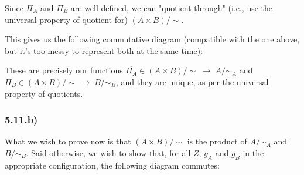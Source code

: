 \documentclass[12pt, letterpaper, twoside]{report}
\begin{document}
Since $\Pi_A$ and $\Pi_B$ are well-defined, we can "quotient through" (i.e., use the universal property of quotient for) $(A \times B)/\sim$.

This gives us the following commutative diagram (compatible with the one above, but it's too messy to represent both at the same time):


These are precisely our functions $\overline{\Pi_A} \in (A \times B)/\sim \; \to \; A/\sim_A$ and $\overline{\Pi_B} \in (A \times B)/\sim \; \to \; B/\sim_B$, and they are unique, as per the universal property of quotients.


\subsubsection*{5.11.b)}

What we wish to prove now is that $(A \times B)/\sim$ is the product of $A/\sim_A$ and $B/\sim_B$. Said otherwise, we wish to show that, for all $Z$, $g_A$ and $g_B$ in the appropriate configuration, the following diagram commutes:

\end{document}
